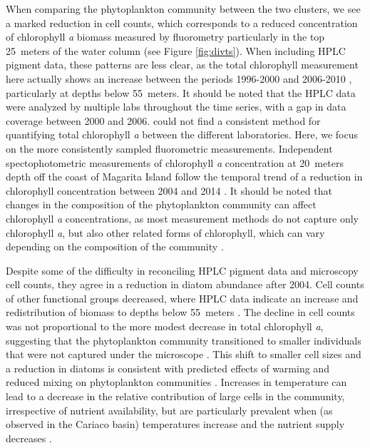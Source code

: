\documentclass[draft]{agujournal2019}
\begin{document}
When comparing the phytoplankton community between the two clusters, we see a marked reduction in cell counts, which corresponds to a reduced concentration of chlorophyll \textit{a} biomass measured by fluorometry particularly in the top \qty{25}{meters} of the water column (see Figure \ref{fig:divts}). When including HPLC pigment data, these patterns are less clear, as the total chlorophyll measurement here actually shows an increase between the periods 1996-2000 and 2006-2010 \cite{pinckney_phytoplankton_2015}, particularly at depths below \qty{55}{meters}. It should be noted that the HPLC data were analyzed by multiple labs throughout the time series, with a gap in data coverage between 2000 and 2006.  could not find a consistent method for quantifying total chlorophyll \textit{a} between the different laboratories. Here, we focus on the more consistently sampled fluorometric measurements. Independent spectophotometric measurements of chlorophyll \textit{a} concentration at \qty{20}{meters} depth off the coast of Magarita Island follow the temporal trend of a reduction in chlorophyll concentration between 2004 and 2014 \cite{gomez_gaspar_variacion_2025}. It should be noted that changes in the composition of the phytoplankton community can affect chlorophyll \textit{a} concentrations, as most measurement methods do not capture only chlorophyll \textit{a}, but also other related forms of chlorophyll, which can vary depending on the composition of the community \cite{welschmeyer_fluorometric_1994}.

Despite some of the difficulty in reconciling HPLC pigment data and microscopy cell counts, they agree in a reduction in diatom abundance after 2004. Cell counts of other functional groups decreased, where HPLC data indicate an increase and redistribution of biomass to depths below \qty{55}{meters} \cite{pinckney_phytoplankton_2015}. The decline in cell counts was not proportional to the more modest decrease in total chlorophyll \textit{a}, suggesting that the phytoplankton community transitioned to smaller individuals that were not captured under the microscope \cite{muller-karger_scientific_2019}. This shift to smaller cell sizes and a reduction in diatoms is consistent with predicted effects of warming and reduced mixing on phytoplankton communities \cite{bopp_response_2005}. Increases in temperature can lead to a decrease in the relative contribution of large cells in the community, irrespective of nutrient availability, but are particularly prevalent when (as observed in the Cariaco basin) temperatures increase and the nutrient supply decreases \cite{mousing_global_2014}. 
\end{document}
